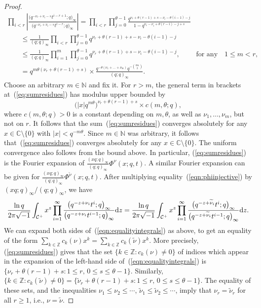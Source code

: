 \documentclass[pdftex]{sigma}
\numberwithin{equation}{section}
\newcommand{\C}{\mathbb{C}}
\newcommand{\Z}{\mathbb{Z}}
\newcommand{\N}{\mathbb{N}}
\newcommand{\CC}{\mathcal{C}}
\begin{document}
\begin{proof}
\begin{gather*}
\prod_{i < r}{\left| \frac{\big(q^{-\nu_r+\nu_i-s}t^{i-r+1}; q\big)_{\infty}}{\big(q^{-\nu_r + \nu_i - s}t^{i-r}; q\big)_{\infty}} \right|} =
\prod_{i < r} \prod_{j = 0}^{\theta - 1} { \frac{q^{\nu_r + \theta (r - 1) + s - \nu_i - \theta(i - 1) - j}}
{1 - q^{\nu_r - \nu_i + \theta(r - i) - j + s}} }\\
\qquad{}
\leq \frac{1}{(q; q)_{\infty}} \prod_{i < r} \prod_{j = 0}^{\theta - 1} {
q^{\nu_r + \theta (r - 1) + s - \nu_i - \theta(i - 1) - j} } \\
\qquad{} \leq \frac{1}{(q; q)_{\infty}} \prod_{i = 1}^m \prod_{j = 0}^{\theta - 1} {
q^{\nu_r + \theta (r - 1) + s - \nu_i - \theta(i - 1) - j} }, \qquad \textrm{ for any} \quad 1 \leq m < r,\\
\qquad {} = q^{m\theta(\nu_r + \theta(r - 1) + s)} \times \frac{q^{-\theta (\nu_1 + \dots + \nu_m)}q^{-{\theta m \choose 2}} }{(q; q)_{\infty}}.
\end{gather*}
Choose an arbitrary $m\in\N$ and f\/ix it.
For $r > m$, the general term in brackets at~(\ref{eq:sumresidues}) has modulus upper bounded by
\[
\big( |x|q^{m\theta} \big)^{\nu_r + \theta(r - 1) + s} \times c(m, \theta; q),
\]
where $c(m, \theta; q) > 0$ is a constant depending on $m, \theta$, as well as $\nu_1, \dots, \nu_m$, but not on $r$.
It follows that the sum~(\ref{eq:sumresidues}) converges absolutely for any $x\in\C\setminus \{0\}$ with $|x| < q^{-m\theta}$.
Since $m\in\N$ was arbitrary, it follows that~(\ref{eq:sumresidues}) converges absolutely for any $x\in\C\setminus\{0\}$.
The uniform convergence also follows from the bound above.
In particular, (\ref{eq:sumresidues}) is the Fourier expansion of $\frac{(xq; q)_{\infty}}{(q; q)_{\infty}}\Phi^{\nu}(x; q, t)$.
A similar Fourier expansion can be given for $\frac{(xq; q)_{\infty}}{(q; q)_{\infty}}\Phi^{\widetilde{\nu}}(x; q, t)$.
After multiplying equality~(\ref{eqn:phiinjective}) by $(xq; q)_{\infty}/(q; q)_{\infty}$, we have
\begin{gather}\label{eqn:equalityintegrals}
\frac{\ln{q}}{2\pi\sqrt{-1}}\int_{\CC^+}{x^z\prod_{i=1}^{\infty}{\frac{\big(q^{-z+\nu_i}t^i; q\big)_{\infty}}{\big(q^{-z+\nu_i}t^{i-1}; q\big)_{\infty}}}{\rm d}z}
= \frac{\ln{q}}{2\pi\sqrt{-1}}\int_{\CC^+}{x^z\prod_{i=1}^{\infty}{\frac{\big(q^{-z+\widetilde{\nu}_i}t^i; q\big)_{\infty}}{\big(q^{-z+\widetilde{\nu}_i}t^{i-1}; q\big)_{\infty}}}{\rm d}z}.
\end{gather}
We can expand both sides of~(\ref{eqn:equalityintegrals}) as above, to get an equality of the form $\sum\limits_{k\in\Z}{c_k(\nu) x^k} = \sum\limits_{k\in\Z}{c_k(\widetilde{\nu}) x^k}$.
More precisely, (\ref{eq:sumresidues}) gives that the set $\{k\in\Z\colon c_k(\nu) \neq 0\}$ of indices which appear in the expansion of the left-hand side of~(\ref{eqn:equalityintegrals}) is $\{\nu_r + \theta(r-1) + s\colon 1\leq r, \, 0\leq s\leq \theta-1\}$. Similarly, $\{k\in\Z\colon c_k(\widetilde{\nu}) \neq 0\} = \{\widetilde{\nu}_r + \theta(r-1) + s\colon 1\leq r, \, 0\leq s\leq \theta-1\}$. The equality of these sets, and the inequalities $\nu_1 \leq \nu_2 \leq \cdots$, $\widetilde{\nu}_1 \leq \widetilde{\nu}_2 \leq \cdots$, imply that $\nu_r = \widetilde{\nu}_r$ for all $r\geq 1$, i.e., $\nu = \widetilde{\nu}$.
\end{proof}
\end{document}

